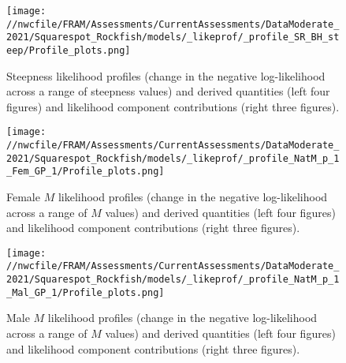 \documentclass[11pt,
  english,
  a4paper,
]{article}
\begin{document}
\tagmcend\tagstructend


\begin{figure}
\centering
\texttt{[image: //nwcfile/FRAM/Assessments/CurrentAssessments/DataModerate\_2021/Squarespot\_Rockfish/models/\_likeprof/\_profile\_SR\_BH\_steep/Profile\_plots.png]}
\caption{Steepness likelihood profiles (change in the negative log-likelihood across a range of steepness values) and derived quantities (left four figures) and likelihood component contributions (right three figures).\label{fig:steepness-profile-combo}}
\end{figure}

\tagmcend\tagstructend


\begin{figure}
\centering
\texttt{[image: //nwcfile/FRAM/Assessments/CurrentAssessments/DataModerate\_2021/Squarespot\_Rockfish/models/\_likeprof/\_profile\_NatM\_p\_1\_Fem\_GP\_1/Profile\_plots.png]}
\caption{Female {\(M\)\leavevmode\tagmcend\tagstructend} likelihood profiles (change in the negative log-likelihood across a range of {\(M\)\leavevmode\tagmcend\tagstructend} values) and derived quantities (left four figures) and likelihood component contributions (right three figures).\label{fig:M_f-profile-combo}}
\end{figure}

\tagmcend\tagstructend


\begin{figure}
\centering
\texttt{[image: //nwcfile/FRAM/Assessments/CurrentAssessments/DataModerate\_2021/Squarespot\_Rockfish/models/\_likeprof/\_profile\_NatM\_p\_1\_Mal\_GP\_1/Profile\_plots.png]}
\caption{Male {\(M\)\leavevmode\tagmcend\tagstructend} likelihood profiles (change in the negative log-likelihood across a range of {\(M\)\leavevmode\tagmcend\tagstructend} values) and derived quantities (left four figures) and likelihood component contributions (right three figures).\label{fig:M_m-profile-combo}}
\end{figure}
\end{document}
